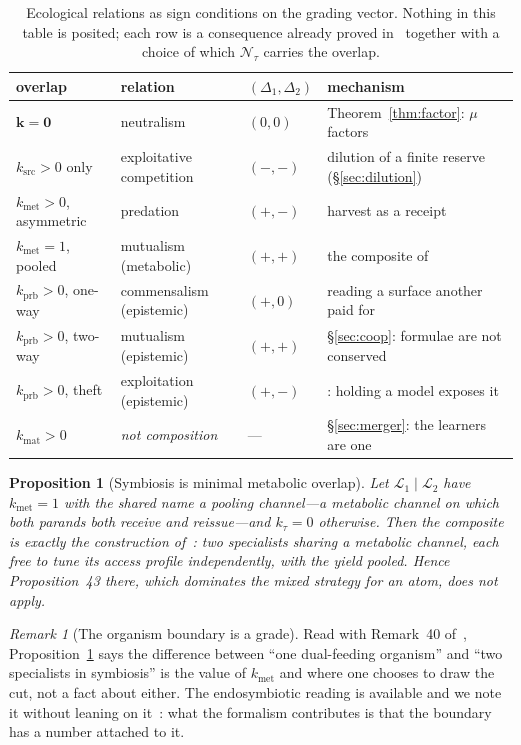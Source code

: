 \documentclass[11pt,a4paper]{article}
\theoremstyle{plain}
\newtheorem{proposition}[theorem]{Proposition}
\theoremstyle{definition}
\theoremstyle{remark}
\newtheorem{remark}[theorem]{Remark}
\newcommand{\Lrn}{\mathcal{L}}
\newcommand{\Nsp}{\mathcal{N}}
\begin{document}
\begin{table}[t]
\centering
\footnotesize
\begin{tabular}{@{}llll@{}}
\toprule
overlap & relation & $(\Delta_1,\Delta_2)$ & mechanism \\
\midrule
$\mathbf{k}=\mathbf{0}$ & neutralism & $(0,0)$ & Theorem~\ref{thm:factor}: $\mu$ factors \\
$k_{\mathrm{src}}>0$ only & exploitative competition & $(-,-)$ &
  dilution of a finite reserve (\S\ref{sec:dilution}) \\
$k_{\mathrm{met}}>0$, asymmetric & predation & $(+,-)$ &
  harvest as a receipt \cite[Def.~23]{scientist} \\
$k_{\mathrm{met}}=1$, pooled & mutualism (metabolic) & $(+,+)$ &
  the composite of \cite[Prop.~44]{scientist} \\
$k_{\mathrm{prb}}>0$, one-way & commensalism (epistemic) & $(+,0)$ &
  reading a surface another paid for \\
$k_{\mathrm{prb}}>0$, two-way & mutualism (epistemic) & $(+,+)$ &
  \S\ref{sec:coop}: formulae are not conserved \\
$k_{\mathrm{prb}}>0$, theft & exploitation (epistemic) & $(+,-)$ &
  \cite[\S10]{scientist}: holding a model exposes it \\
$k_{\mathrm{mat}}>0$ & \emph{not composition} & --- &
  \S\ref{sec:merger}: the learners are one \\
\bottomrule
\end{tabular}
\caption{Ecological relations as sign conditions on the grading vector. Nothing in this table is
posited; each row is a consequence already proved in~\cite{scientist} together with a choice of
which $\Nsp_\tau$ carries the overlap.}
\label{tab:relations}
\end{table}

\begin{proposition}[Symbiosis is minimal metabolic overlap]\label{prop:symb}
Let $\Lrn_1 \mid \Lrn_2$ have $k_{\mathrm{met}} = 1$ with the shared name a pooling channel---a
metabolic channel on which both parands both receive and reissue---and $k_\tau = 0$ otherwise.
Then the composite is exactly the construction of~\cite[Prop.~44]{scientist}: two specialists
sharing a metabolic channel, each free to tune its access profile independently, with the yield
pooled. Hence Proposition~43 there, which dominates the mixed strategy for an atom, does not
apply.
\end{proposition}

\begin{remark}[The organism boundary is a grade]
Read with Remark~40 of~\cite{scientist}, Proposition~\ref{prop:symb} says the difference between
``one dual-feeding organism'' and ``two specialists in symbiosis'' is the value of
$k_{\mathrm{met}}$ and where one chooses to draw the cut, not a fact about either. The
endosymbiotic reading is available and we note it without leaning on it~\cite{margulis}: what the
formalism contributes is that the boundary has a number attached to it.
\end{remark}
\end{document}
